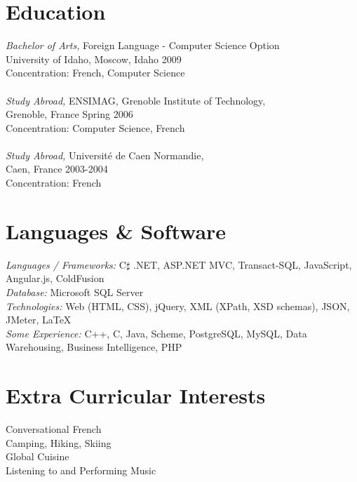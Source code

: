 \documentclass[line,margin]{res}
\begin{document}
\begin{resume}
 
\section{Education} {\sl Bachelor of Arts,} Foreign Language - Computer Science Option\\
                University of Idaho, Moscow, Idaho
                2009 \\
                Concentration: French, Computer Science\\
		\\
		{\sl Study Abroad,} 
		ENSIMAG, Grenoble Institute of Technology, \\ Grenoble, France 
		Spring 2006 \\
		Concentration: Computer Science, French \\
		\\
		{\sl Study Abroad,} 
		Universit\'{e} de Caen Normandie, \\ Caen, France 
		2003-2004 \\
		Concentration: French
		
 
 
\section{Languages \& Software} {\sl Languages / Frameworks:} C\ensuremath{\sharp}  .NET, ASP.NET MVC, Transact-SQL, JavaScript, Angular.js, ColdFusion \\
				{\sl Database:} Microsoft SQL Server \\
				{\sl Technologies:} Web (HTML, CSS), jQuery, XML (XPath, XSD schemas), JSON, JMeter, \LaTeX \\
				{\sl Some Experience:} C++, C, Java, Scheme, PostgreSQL, MySQL, Data Warehousing, Business Intelligence, PHP \\ 

\section{Extra Curricular Interests}             
	    Conversational French \\
        Camping, Hiking, Skiing \\
        Global Cuisine \\
        Listening to and Performing Music

\end{resume}
\end{document}

